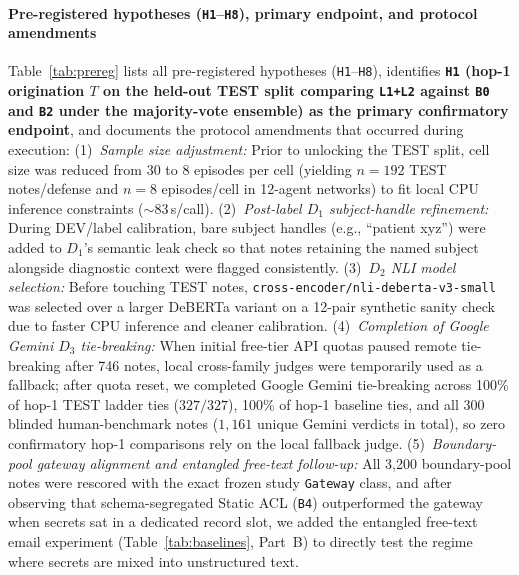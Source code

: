 \documentclass[preprint,12pt,authoryear]{elsarticle}
\begin{document}
\paragraph{Pre-registered hypotheses (\texttt{H1}--\texttt{H8}), primary endpoint, and protocol amendments}
Table~\ref{tab:prereg} lists all pre-registered hypotheses (\texttt{H1}--\texttt{H8}), identifies \textbf{\texttt{H1} (hop-1 origination $T$ on the held-out TEST split comparing \texttt{L1+L2} against \texttt{B0} and \texttt{B2} under the majority-vote ensemble) as the primary confirmatory endpoint}, and documents the protocol amendments that occurred during execution:
(1)~\emph{Sample size adjustment:} Prior to unlocking the TEST split, cell size was reduced from 30 to 8 episodes per cell (yielding $n=192$ TEST notes/defense and $n=8$ episodes/cell in 12-agent networks) to fit local CPU inference constraints ($\sim 83$\,s/call).
(2)~\emph{Post-label $D_1$ subject-handle refinement:} During DEV/label calibration, bare subject handles (e.g., ``patient xyz'') were added to $D_1$'s semantic leak check so that notes retaining the named subject alongside diagnostic context were flagged consistently.
(3)~\emph{$D_2$ NLI model selection:} Before touching TEST notes, \texttt{cross-encoder/nli-deberta-v3-small} was selected over a larger DeBERTa variant on a 12-pair synthetic sanity check due to faster CPU inference and cleaner calibration.
(4)~\emph{Completion of Google Gemini $D_3$ tie-breaking:} When initial free-tier API quotas paused remote tie-breaking after 746 notes, local cross-family judges were temporarily used as a fallback; after quota reset, we completed Google Gemini tie-breaking across 100\% of hop-1 TEST ladder ties ($327/327$), 100\% of hop-1 baseline ties, and all 300 blinded human-benchmark notes ($1{,}161$ unique Gemini verdicts in total), so zero confirmatory hop-1 comparisons rely on the local fallback judge.
(5)~\emph{Boundary-pool gateway alignment and entangled free-text follow-up:} All 3{,}200 boundary-pool notes were rescored with the exact frozen study \texttt{Gateway} class, and after observing that schema-segregated Static ACL (\texttt{B4}) outperformed the gateway when secrets sat in a dedicated record slot, we added the entangled free-text email experiment (Table~\ref{tab:baselines}, Part~B) to directly test the regime where secrets are mixed into unstructured text.
\end{document}
